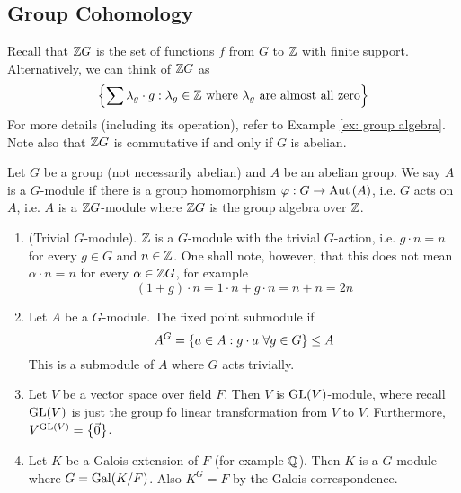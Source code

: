 \newpage
\subsection{Group Cohomology}
Recall that ${\mathbb Z} G$ is the set of functions $f$ from $G$ to ${\mathbb Z}$ with finite support. Alternatively, we can think of ${\mathbb Z} G$ as 
\[\left\{\sum \lambda_g \cdot g:\lambda_g \in {\mathbb Z}\text{ where $\lambda_g$ are almost all zero}\right\}\]
For more details (including its operation), refer to Example \ref{ex: group algebra}. Note also that ${\mathbb Z} G$ is commutative if and only if $G$ is abelian.

\medskip

\begin{defn} [$G$-module]
    Let $G$ be a group (not necessarily abelian) and $A$ be an abelian group. We say $A$ is a $G$-module if there is a group homomorphism $\varphi:G\to \operatorname{Aut}\left(A\right)$, i.e. $G$ acts on $A$, i.e. $A$ is a ${\mathbb Z} G$-module where ${\mathbb Z} G$ is the group algebra over ${\mathbb Z}$.
\end{defn}

\medskip

\begin{ex}
    \hfill

    \begin{enumerate}
        \item (Trivial $G$-module). ${\mathbb Z}$ is a $G$-module with the trivial $G$-action, i.e. $g\cdot n = n$ for every $g\in G$ and $n\in {\mathbb Z}$. One shall note, however, that this does not mean $\alpha\cdot n = n$ for every $\alpha \in {\mathbb Z} G$, for example
        \[(1+g)\cdot n = 1\cdot n + g\cdot n = n+n = 2n\]
        \item Let $A$ be a $G$-module. The fixed point submodule if 
        \[A^G = \left\{a\in A : g\cdot a\ \forall g\in G\right\}\leq A\]
        This is a submodule of $A$ where $G$ acts trivially.
        \item Let $V$ be a vector space over field $F$. Then $V$ is $\operatorname{GL}(V)$-module, where recall $\operatorname{GL}(V)$ is just the group fo linear transformation from $V$ to $V$. Furthermore, $V^{\operatorname{GL}(V)}= \left\{\vec 0\right\}$.
        \item Let $K$ be a Galois extension of $F$ (for example ${\mathbb Q}$). Then $K$ is a $G$-module where $G = \operatorname{Gal}(K/F)$. Also $K^G = F$ by the Galois correspondence.
    \end{enumerate}
\end{ex}

\medskip

